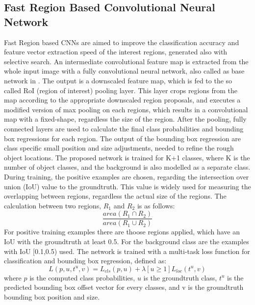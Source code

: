 \subsection{Fast Region Based Convolutional Neural Network}\label{s:fastrcnn}
Fast Region based CNNs \cite{Girshick:2016:RCN:2881668.2882239} are aimed to improve the classification accuracy and feature vector extraction speed of the interest regions, generated also with selective search. An intermediate convolutional feature map is extracted from the whole input image with a fully convolutional neural network, also called as base network in \citep{journals/corr/SermanetEZMFL13}. The output is a downscaled feature map, which is fed to the so called RoI (region of interest) pooling layer. This layer crops regions from the map according to the appropriate downscaled region proposals, and executes a modified version of max pooling on each regions, which results in a convolutional map with a fixed-shape, regardless the size of the region.
\bigbreak
After the pooling, fully connected layers are used to calculate the final class probabilities and bounding box regressions for each region. The output of the bounding box regression are class specific small position and size adjustments, needed to refine the rough object locations.
\bigbreak
The proposed network is trained for K+1 classes, where K is the number of object classes, and the background is also modelled as a separate class. During training, the positive examples are chosen, regarding the intersection over union (IoU) value to the groundtruth. This value is widely used for measuring the overlapping between regions, regardless the actual size of the regions. The calculation between two regions, $R_1$ and $R_2$ is as follows:
\bigbreak
\begin{equation}
        \frac{area ( R_1 \cap R_2 )}{area ( R_1 \cup R_2 )}
        \label{eq:iou}
\end{equation}
\bigbreak
For positive training examples there are thoose regions applied, which have an IoU with the groundtruth at least 0.5. For the background class are the examples with IoU [0.1,0.5) used.
\bigbreak
The network is trained with a multi-task loss function for classification and bounding box regression, defined as:
\bigbreak
\begin{equation}\label{eq:frcnn-loss}
	L(p, u, t^u, v) = L_{cls}(p, u) + \lambda [u \ge 1] L_{loc}(t^u, v)
\end{equation}
\bigbreak
where $p$ is the computed class probabilities, $u$ is the groundtruth class, $t^u$ is the predicted bounding box offset vector for every classes, and v is the groundtruth bounding box position and size.

